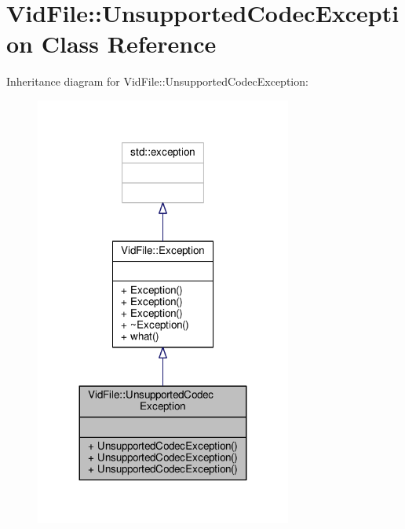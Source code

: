 \hypertarget{classVidFile_1_1UnsupportedCodecException}{}\section{Vid\+File\+:\+:Unsupported\+Codec\+Exception Class Reference}
\label{classVidFile_1_1UnsupportedCodecException}


Inheritance diagram for Vid\+File\+:\+:Unsupported\+Codec\+Exception\+:
\nopagebreak
\begin{figure}[H]
\begin{center}
\leavevmode
\includegraphics[width=239pt]{d3/d1f/classVidFile_1_1UnsupportedCodecException__inherit__graph}
\end{center}
\end{figure}


